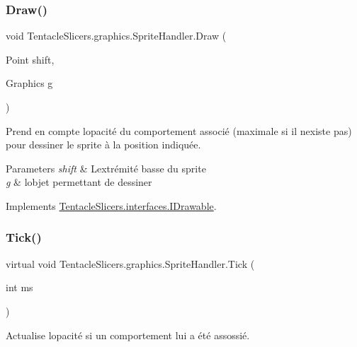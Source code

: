 \subsubsection{\texorpdfstring{Draw()}{Draw()}}
{\footnotesize\ttfamily void Tentacle\+Slicers.\+graphics.\+Sprite\+Handler.\+Draw (\begin{DoxyParamCaption}\item[{Point}]{shift,  }\item[{Graphics}]{g }\end{DoxyParamCaption})}



Prend en compte l\textquotesingle{}opacité du comportement associé (maximale si il n\textquotesingle{}existe pas) pour dessiner le sprite à la position indiquée. 


\begin{DoxyParams}{Parameters}
{\em shift} & L\textquotesingle{}extrémité basse du sprite \\
\hline
{\em g} & l\textquotesingle{}objet permettant de dessiner \\
\hline
\end{DoxyParams}


Implements \hyperlink{interface_tentacle_slicers_1_1interfaces_1_1_i_drawable}{Tentacle\+Slicers.\+interfaces.\+I\+Drawable}.

\mbox{\label{class_tentacle_slicers_1_1graphics_1_1_sprite_handler_ab08b58ee3a955cbb5621d8aa4e32c97b}} 
\subsubsection{\texorpdfstring{Tick()}{Tick()}}
{\footnotesize\ttfamily virtual void Tentacle\+Slicers.\+graphics.\+Sprite\+Handler.\+Tick (\begin{DoxyParamCaption}\item[{int}]{ms }\end{DoxyParamCaption})\hspace{0.3cm}{\ttfamily [virtual]}}



Actualise l\textquotesingle{}opacité si un comportement lui a été assossié. 


